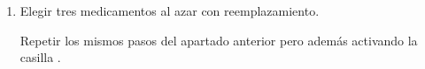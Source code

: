 \begin{enumerate}[leftmargin=*]
\begin{enumerate}
\item Elegir tres medicamentos al azar con reemplazamiento.
\begin{indicacion}
Repetir los mismos pasos del apartado anterior pero además activando la casilla .
\end{indicacion}
\end{enumerate}





\end{enumerate}
